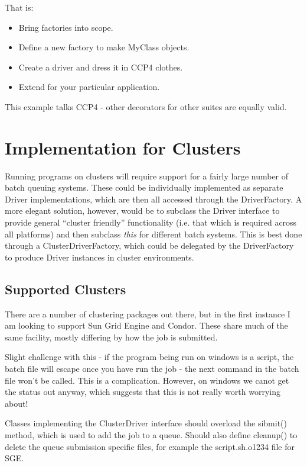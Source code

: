 \documentclass[a4paper, 11pt]{article}
\begin{document}
That is:

\begin{itemize}
\item{Bring factories into scope.}
\item{Define a new factory to make MyClass objects.}
\item{Create a driver and dress it in CCP4 clothes.}
\item{Extend for your particular application.}
\end{itemize}

\noindent
This example talks CCP4 - other decorators for other suites are equally
valid.

\section{Implementation for Clusters}

Running programs on clusters will require support for a fairly large number
of batch queuing systems. These could be individually implemented as separate
Driver implementations, which are then all accessed through the DriverFactory.
A more elegant solution, however, would be to subclass the Driver interface to 
provide general ``cluster friendly'' functionality (i.e. that which is required
across all platforms) and then subclass \emph{this} for different batch 
systems. This is best done through a ClusterDriverFactory, which could be
delegated by the DriverFactory to produce Driver instances in cluster
environments.

\subsection{Supported Clusters}

There are a number of clustering packages out there, but in the first instance 
I am looking to support Sun Grid Engine and Condor. These share much of the
same facility, mostly differing by how the job is submitted.

Slight challenge with this - if the program being run on windows is a script,
the batch file will escape once you have run the job - the next command in the
batch file won't be called. This is a complication. However, on windows we
canot get the status out anyway, which suggests that this is not really worth
worrying about!

Classes implementing the ClusterDriver interface should overload the sibmit()
method, which is used to add the job to a queue. Should also define cleanup()
to delete the queue submission specific files, for example the 
script.sh.o1234 file for SGE.
\end{document}
